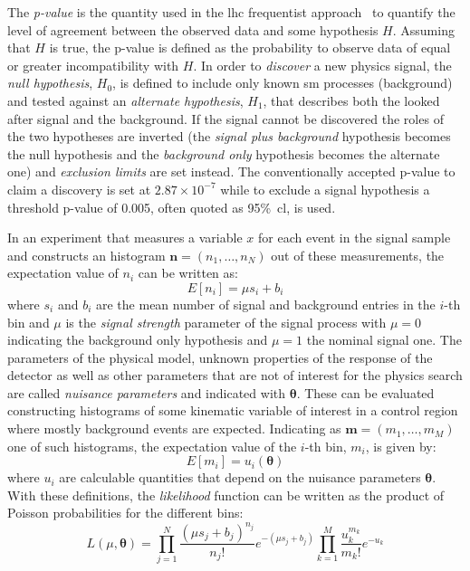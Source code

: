 The \emph{p-value} is the quantity used in the \gls{lhc} frequentist
approach~\cite{StatProcedure} to quantify the level of agreement between the
observed data and some hypothesis $H$. Assuming that $H$ is true, the p-value is
defined as the probability to observe data of equal or greater incompatibility
with $H$. In order to \emph{discover} a new physics signal, the \emph{null
  hypothesis}, $H_0$, is defined to include only known \gls{sm} processes
(background) and tested against an \emph{alternate hypothesis}, $H_1$, that
describes both the looked after signal and the background. If the signal cannot
be discovered the roles of the two hypotheses are inverted (the \emph{signal plus
  background} hypothesis becomes the null hypothesis and the \emph{background
  only} hypothesis becomes the alternate one) and \emph{exclusion limits} are
set instead. The conventionally accepted p-value to claim a discovery is set at
$2.87 \times 10^{-7}$ while to exclude a signal hypothesis a threshold p-value
of 0.005, often quoted as 95\%~\gls{cl}, is used.

In an experiment that measures a variable $x$ for each event in the signal
sample and constructs an histogram $\boldsymbol{n} = (n_1, \dots, n_N)$ out of
these measurements, the expectation value of $n_i$ can be written as:
\begin{equation}
  \label{eq:88}
  E[n_i] = \mu s_i + b_i
\end{equation}
where $s_i$ and $b_i$ are the mean number of signal and background entries in
the $i$-th bin and $\mu$ is the \emph{signal strength} parameter of the signal
process with $\mu = 0$ indicating the background only hypothesis and $\mu = 1$
the nominal signal one. The parameters of the physical model, unknown properties
of the response of the detector as well as other parameters that are not of
interest for the physics search are called \emph{nuisance parameters} and
indicated with $\boldsymbol{\theta}$. These can be evaluated constructing
histograms of some kinematic variable of interest in a control region where
mostly background events are expected. Indicating as
$\boldsymbol{m} = (m_1, \dots, m_M)$ one of such histograms, the expectation
value of the $i$-th bin, $m_i$, is given by:
\begin{equation}
  \label{eq:89}
  E[m_i] = u_i(\boldsymbol{\theta})
\end{equation}
where $u_i$ are calculable quantities that depend on the nuisance parameters
$\boldsymbol{\theta}$. With these definitions, the \emph{likelihood} function
can be written as the product of Poisson probabilities for the different bins:
\begin{equation}
  \label{eq:115}
  L(\mu, \boldsymbol{\theta}) = \prod_{j = 1}^N \frac{(\mu s_j +
    b_j)^{n_j}}{n_j!} e^{-(\mu s_j + b_j)} \prod_{k = 1}^M
  \frac{u_k^{m_k}}{m_k!} e^{-u_k}
\end{equation}

